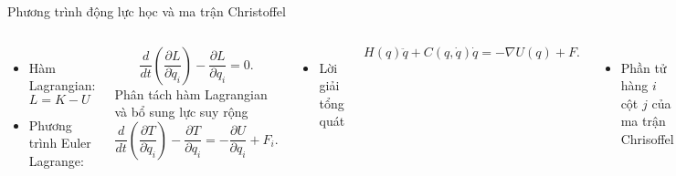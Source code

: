 \begin{frame}{Phương trình động lực học và ma trận Christoffel}
    \begin{columns}
        \begin{itemize}
            \item Hàm Lagrangian: \( L = K - U\)
            \item Phương trình Euler Lagrange:
        \end{itemize}
        \begin{equation}
            \dfrac{d}{dt} \left( \dfrac{\partial L}{\partial \dot{q}_i} \right) - \dfrac{\partial L}{\partial q_i} = 0.
        \end{equation}
        Phân tách hàm Lagrangian và bổ sung lực suy rộng
        \begin{equation}
            \dfrac{d}{dt} \left( \dfrac{\partial T}{\partial \dot{q}_i} \right) - \dfrac{\partial T}{\partial q_i} = - \dfrac{\partial U}{\partial q_i} + F_i.
        \end{equation}
        \begin{itemize}
            \item Lời giải tổng quát
        \end{itemize}
        \begin{equation}
            H(q) \ddot{q} + C(q, \dot{q}) \dot{q} = -\nabla U(q) + F.
        \end{equation}
        \begin{itemize}
            \item Phần tử hàng \(i\) cột \(j\) của ma trận Chrisoffel
        \end{itemize}
        \begin{equation}
            C_{ij} = \sum_{k=1}^{n} \frac{1}{2} \left( \frac{\partial H_{ik}}{\partial q_j} + \frac{\partial H_{jk}}{\partial q_i} - \frac{\partial H_{ij}}{\partial q_k} \right) \dot{q}_k.
        \end{equation}
    \end{columns}
\end{frame}